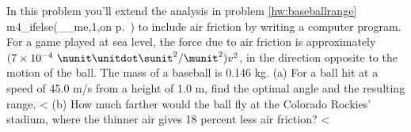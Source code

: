         In this problem you'll extend the analysis in problem
        \ref{hw:baseballrange} 
        m4_ifelse(__me,1,on p.~\pageref{hw:baseballrange})
        to include air friction by writing a computer program. For a game played at
        sea level, the force due to air friction
        is approximately $(7\times10^{-4}\ \nunit\unitdot\sunit^2/\munit^2)v^2$,
        in the direction opposite to the motion of the ball.%
The mass of a
        baseball is 0.146 kg.\hwendpart
        (a) For a ball hit at a speed
        of 45.0 m/s from a height of 1.0 m, find the optimal angle and the resulting
        range.         <%
        (b) How much farther would the ball fly at the Colorado Rockies' stadium,
        where the thinner air gives 18 percent less air friction? 
        <%
